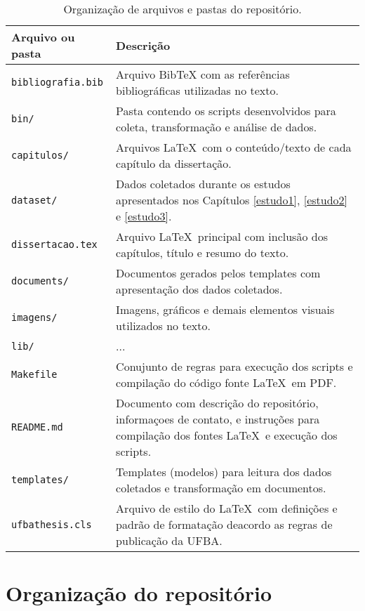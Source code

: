 \begin{table}[h]
\caption{Organização de arquivos e pastas do repositório.}
\centering
\begin{tabular}{ l p{10cm} }
  \hline
  Arquivo ou pasta            & Descrição           \\
  \hline
  \texttt{bibliografia.bib}   & Arquivo BibTeX com as referências bibliográficas utilizadas no texto. \\
  \texttt{bin/}               & Pasta contendo os scripts desenvolvidos para coleta, transformação e análise de dados. \\
  \texttt{capitulos/}         & Arquivos \LaTeX \ com o conteúdo/texto de cada capítulo da dissertação. \\
  \texttt{dataset/}           & Dados coletados durante os estudos apresentados nos Capítulos \ref{estudo1}, \ref{estudo2} e \ref{estudo3}. \\
  \texttt{dissertacao.tex}    & Arquivo \LaTeX \ principal com inclusão dos capítulos, título e resumo do texto. \\
  \texttt{documents/}         & Documentos gerados pelos templates com apresentação dos dados coletados. \\
  \texttt{imagens/}           & Imagens, gráficos e demais elementos visuais utilizados no texto. \\
  \texttt{lib/}               & ...                 \\
  \texttt{Makefile}           & Conujunto de regras para execução dos scripts e compilação do código fonte \LaTeX \ em PDF.                 \\
  \texttt{README.md}          & Documento com descrição do repositório, informaçoes de contato, e instruções para compilação dos fontes \LaTeX \ e execução dos scripts. \\
  \texttt{templates/}         & Templates (modelos) para leitura dos dados coletados e transformação em documentos. \\
  \texttt{ufbathesis.cls}     & Arquivo de estilo do \LaTeX \ com definições e padrão de formatação deacordo as regras de publicação da UFBA. \\
  \hline
\end{tabular}
\label{arquivos-repositorio}
\end{table}

\section{Organização do repositório}

